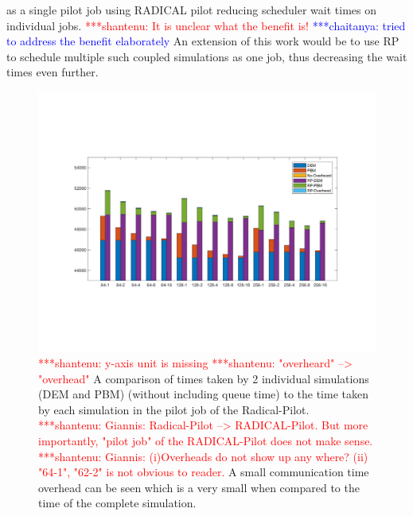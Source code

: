 \documentclass[preprint,11pt,authoryear]{elsarticle}
\newcommand{\jhanote}[1]{ {\textcolor{red} { ***shantenu: #1 }}}
\newcommand{\csnote}[1]{ {\textcolor{blue} { ***chaitanya: #1 }}}
\newcommand{\jhanote}[1]{ {\textcolor{red} { ***shantenu: #1 }}}
\newcommand{\csnote}[1]{}
\begin{document}
as a single pilot job using RADICAL pilot reducing scheduler wait times on individual 
jobs. \jhanote{It is unclear what the
benefit is!}\csnote{tried to address the benefit elaborately} 
An extension of this work would be to use RP to schedule multiple such coupled simulations 
as one job, thus decreasing the wait times even further.
\begin{figure}
\centering
\includegraphics[scale=0.7]{rp_final.pdf}
\caption{\jhanote{y-axis unit is missing} \jhanote{"overheard" --> "overhead"} A comparison of times taken by 2 individual simulations (DEM and PBM) (without 
including queue time) to the  time taken by each simulation in the pilot job
of the Radical-Pilot. \jhanote{Giannis: Radical-Pilot --> RADICAL-Pilot. But
more importantly, "pilot job" of the RADICAL-Pilot does not make sense.}
\jhanote{Giannis: (i)Overheads do not show up any where? (ii) "64-1", "62-2"
is not obvious to reader.}A small communication time overhead can be seen
which is a very small when compared to the time of the complete simulation.}
\label{fig:rslts_RP_time_plot}
\end{figure}
	    
\end{document}
